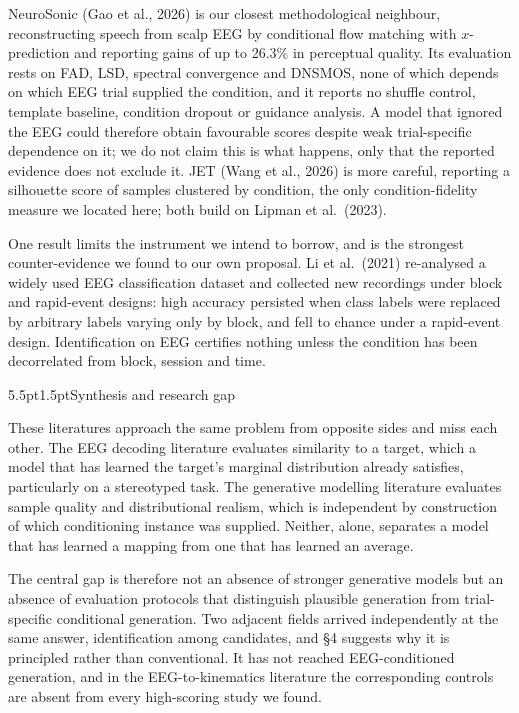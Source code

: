 \documentclass[11pt]{article}
\makeatletter
\renewcommand\section{\@startsection{section}{1}{\z@}%
  {5.5pt\@plus2pt\@minus2pt}{1.5pt}{\normalfont\large\bfseries}}
\makeatother
\begin{document}
NeuroSonic (Gao et al., 2026) is our closest methodological neighbour, reconstructing speech from scalp EEG by conditional flow matching with $x$-prediction and reporting gains of up to 26.3\% in perceptual quality. Its evaluation rests on FAD, LSD, spectral convergence and DNSMOS, none of which depends on which EEG trial supplied the condition, and it reports no shuffle control, template baseline, condition dropout or guidance analysis. A model that ignored the EEG could therefore obtain favourable scores despite weak trial-specific dependence on it; we do not claim this is what happens, only that the reported evidence does not exclude it. JET (Wang et al., 2026) is more careful, reporting a silhouette score of samples clustered by condition, the only condition-fidelity measure we located here; both build on Lipman et al.~(2023).

One result limits the instrument we intend to borrow, and is the strongest counter-evidence we found to our own proposal. Li et al.~(2021) re-analysed a widely used EEG classification dataset and collected new recordings under block and rapid-event designs: high accuracy persisted when class labels were replaced by arbitrary labels varying only by block, and fell to chance under a rapid-event design. Identification on EEG certifies nothing unless the condition has been decorrelated from block, session and time.

\section{Synthesis and research gap}

These literatures approach the same problem from opposite sides and miss each other. The EEG decoding literature evaluates similarity to a target, which a model that has learned the target's marginal distribution already satisfies, particularly on a stereotyped task. The generative modelling literature evaluates sample quality and distributional realism, which is independent by construction of which conditioning instance was supplied. Neither, alone, separates a model that has learned a mapping from one that has learned an average.

The central gap is therefore not an absence of stronger generative models but an absence of evaluation protocols that distinguish plausible generation from trial-specific conditional generation. Two adjacent fields arrived independently at the same answer, identification among candidates, and \S4 suggests why it is principled rather than conventional. It has not reached EEG-conditioned generation, and in the EEG-to-kinematics literature the corresponding controls are absent from every high-scoring study we found.
\end{document}
